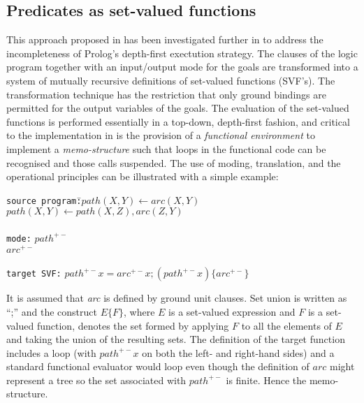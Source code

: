 \subsection{Predicates as set-valued functions}

This approach proposed in \cite{Red84} has been investigated further in \cite{CSA87} to
address the incompleteness of Prolog's depth-first exectution strategy.  The clauses of the
logic program together with an input/output mode for the goals are transformed into a
system of mutually recursive definitions of set-valued functions (SVF's). The transformation technique
has the restriction that only ground bindings are permitted for the output variables of the
goals.  The evaluation of the set-valued functions is performed essentially in a top-down,
depth-first fashion, and critical to the implementation in \cite{CSA87} is the provision
of a \textit{functional environment} to implement a \textit{memo-structure} such that loops in
the functional code can be recognised and those calls suspended.  The use of moding,
translation, and the operational principles can be illustrated with a simple example:

\begin{tabbing}
\texttt{source program:}\quad\=$\mathit{path}(X, Y) \leftarrow \mathit{arc}(X,Y)$\\
\>                             $\mathit{path}(X, Y) \leftarrow \mathit{path}(X, Z),
				\mathit{arc}(Z, Y)$\\
\\
\texttt{mode:}\>               $\mathit{path}^{+-}$\\
\>                             $\mathit{arc}^{+-}$\\
\\
\texttt{target SVF:}\>         $\mathit{path}^{+-} x = \mathit{arc}^{+-} x;
				(\mathit{path}^{+-} x)\{\mathit{arc}^{+-}\}$
\end{tabbing}

It is assumed that \textit{arc} is defined by ground unit clauses.  Set union is written
as ``;'' and the construct $E\{F\}$, where $E$ is a set-valued expression and $F$ is a
set-valued function, denotes the set formed by applying $F$ to all the elements of $E$
and taking the union of the resulting sets.  The definition of the target function includes
a loop (with $path^{+-} x$ on both the left- and right-hand sides) and a standard functional
evaluator would loop even though the definition of $arc$ might represent a tree so the
set associated with $path^{+-}$ is finite.  Hence the memo-structure.

